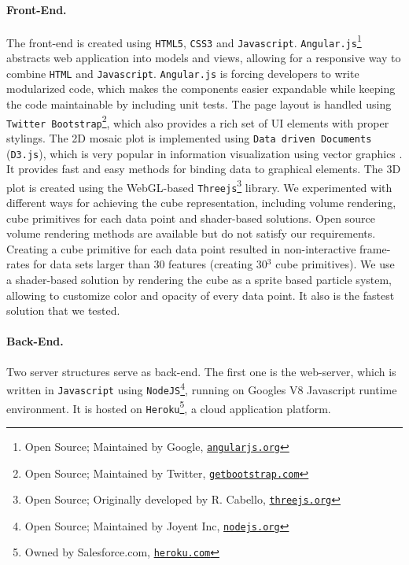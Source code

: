 \documentclass[journal]{style/vgtc} 			          %
\begin{document}
\paragraph{Front-End.}
The front-end is created using \texttt{HTML5}, \texttt{CSS3} and \texttt{Javascript}.
\texttt{Angular.js}\footnote{Open Source; Maintained by Google, \href{https://www.angularjs.org/}{\texttt{angularjs.org}}} abstracts web application into models and views, allowing for a responsive way to combine \texttt{HTML} and \texttt{Javascript}.
\texttt{Angular.js} is forcing developers to write modularized code, which makes the components easier expandable while keeping the code maintainable by including unit tests.
The page layout is handled using \texttt{Twitter Bootstrap}\footnote{Open Source; Maintained by Twitter, \href{http://getbootstrap.com}{\texttt{getbootstrap.com}}}, which also provides a rich set of UI elements with proper stylings.
The 2D mosaic plot is implemented using \texttt{Data driven Documents} (\texttt{D3.js}), which is very popular in information visualization using vector graphics \cite{D3}.
It provides fast and easy methods for binding data to graphical elements.
The 3D plot is created using the WebGL-based \texttt{Threejs}\footnote{Open Source; Originally developed by R. Cabello, \href{http://threejs.org}{\texttt{threejs.org}}} library.
We experimented with different ways for achieving the cube representation, including volume rendering, cube primitives for each data point and shader-based solutions.
Open source volume rendering methods are available but do not satisfy our requirements.
Creating a cube primitive for each data point resulted in non-interactive frame-rates for data sets larger than 30 features (creating 30$^3$ cube primitives).
We use a shader-based solution by rendering the cube as a sprite based particle system, allowing to customize color and opacity of every data point.
It also is the fastest solution that we tested.

\paragraph{Back-End.}
Two server structures serve as back-end.
The first one is the web-server, which is written in \texttt{Javascript} using \texttt{NodeJS}\footnote{Open Source; Maintained by Joyent Inc, \href{http://nodejs.org}{\texttt{nodejs.org}}}, running on Googles V8 Javascript runtime environment.
It is hosted on \texttt{Heroku}\footnote{Owned by Salesforce.com, \href{https://www.heroku.com/}{\texttt{heroku.com}}}, a cloud application platform.
\end{document}
